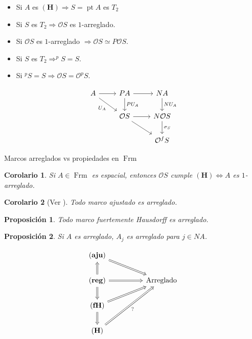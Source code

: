 \documentclass[compress,12pt]{beamer}
\DeclareMathOperator{\pt}{pt}
\DeclareMathOperator{\Frm}{Frm}
\newtheorem{cor}{Corolario}
\newtheorem{prop}{Proposición}
\begin{document}
\begin{frame}[fragile]
\begin{itemize}
\item Si $A$ es $\mathbf{(H)}\Rightarrow S=\pt A$ es $T_2$
\item<2-> Si $S$ es $T_2\Rightarrow \mathcal{O}S$ es $1$-arreglado.
\item<3-> Si $\mathcal{O}S$ es $1$-arreglado $\Rightarrow \mathcal{O}S\simeq P\mathcal{O}S$.
\item<4-> Si $S$ es $T_2\Rightarrow ^pS=S$.
\item<5-> Si $^pS=S\Rightarrow \mathcal{O}S=\mathcal{O}^pS$.
\end{itemize}
\[\begin{tikzcd}
	A & PA & NA \\
	& {\mathcal{O}S} & {N\mathcal{O}S} \\
	&& {\mathcal{O}^fS}
	\arrow[from=1-1, to=1-2]
	\arrow["{U_A}"', from=1-1, to=2-2]
	\arrow[from=1-2, to=1-3]
	\arrow["{PU_A}", from=1-2, to=2-2]
	\arrow["{NU_A}", from=1-3, to=2-3]
	\arrow[from=2-2, to=2-3]
	\arrow[from=2-2, to=3-3]
	\arrow["{\sigma_S}", from=2-3, to=3-3]
\end{tikzcd}\]
\end{frame}

\begin{frame}{Marcos arreglados vs propiedades en $\Frm$}
\begin{cor}
Si $A\in \Frm$ es espacial, entonces $\mathcal{O}S$ cumple $\mathbf{(H)}\Leftrightarrow A$ es $1$-arreglado.
\end{cor}

\begin{cor}[Ver \cite{H.S.R}]
	Todo marco ajustado es arreglado.
\end{cor}

\begin{prop}
Todo marco fuertemente Hausdorff es arreglado.
\end{prop}

\begin{prop}
Si $A$ es arreglado, $A_j$ es arreglado para $j\in NA$.
\end{prop}

\end{frame}

\begin{frame}[fragile]
\[\begin{tikzcd}
	{\mathbf{(aju)}} \\
	{\mathbf{(reg)}} && {\mbox{Arreglado}} \\
	{\mathbf{(fH)}} \\
	{\mathbf{(H)}}
	\arrow[Rightarrow, from=1-1, to=2-3]
	\arrow[Rightarrow, from=2-1, to=1-1]
	\arrow[Rightarrow, from=2-1, to=2-3]
	\arrow[Rightarrow, from=2-1, to=3-1]
	\arrow[Rightarrow, from=3-1, to=2-3]
	\arrow[Rightarrow, from=3-1, to=4-1]
	\arrow["{?}"', Rightarrow, from=4-1, to=2-3]
\end{tikzcd}\]
\end{frame}
\end{document}
